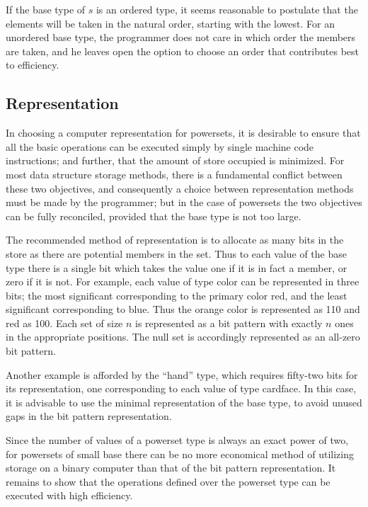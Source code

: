 \noindent
If the base type of $s$ is an ordered type, it seems reasonable to postulate that the elements will be taken in the natural order, starting with the lowest. For an unordered base type, the programmer does not care in which order the members are taken, and he leaves open the option to choose an order that contributes best to efficiency.

\subsection{Representation}

In choosing a computer representation for powersets, it is desirable to ensure that all the basic operations can be executed simply by single machine code instructions; and further, that the amount of store occupied is minimized. For most data structure storage methods, there is a fundamental conflict between these two objectives, and consequently a choice between representation methods must be made by the programmer; but in the case of powersets the two objectives can be fully reconciled, provided that the base type is not too large.

The recommended method of representation is to allocate as many bits in the store as there are potential members in the set. Thus to each value of the base type there is a single bit which takes the value one if it is in fact a member, or zero if it is not. For example, each value of type color can be represented in three bits; the most significant corresponding to the primary color red, and the least significant corresponding to blue. Thus the orange color is represented as 110 and red as 100. Each set of size $n$ is represented as a bit pattern with exactly $n$ ones in the appropriate positions. The null set is accordingly represented as an all-zero bit pattern.

Another example is afforded by the ``hand'' type, which requires fifty-two bits for its representation, one corresponding to each value of type cardface. In this case, it is advisable to use the minimal representation of the base type, to avoid unused gaps in the bit pattern representation.

Since the number of values of a powerset type is always an exact power of two, for powersets of small base there can be no more economical method of utilizing storage on a binary computer than that of the bit pattern representation. It remains to show that the operations defined over the powerset type can be executed with high efficiency.

